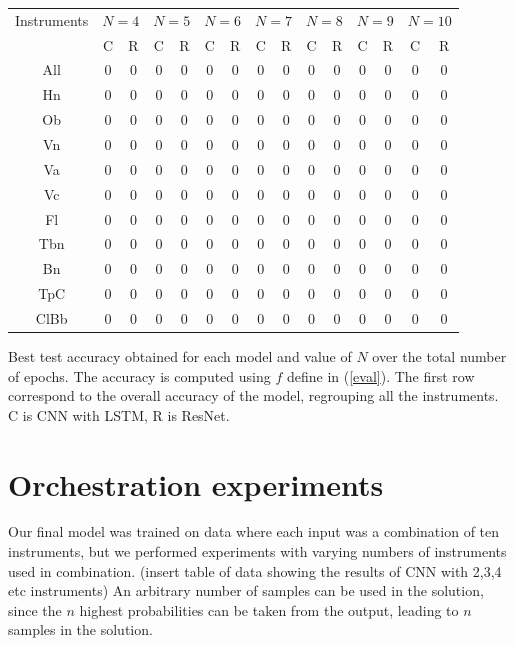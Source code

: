 \documentclass{article}
\begin{document}
\begin{table}
\begin{tabular}{|c|c|c|c|c|c|c|c|c|c|c|c|c|c|c|}
\hline
Instruments & \multicolumn{2}{c|}{$N=4$} & \multicolumn{2}{c|}{$N=5$}& \multicolumn{2}{c|}{$N=6$}& \multicolumn{2}{c|}{$N=7$}& \multicolumn{2}{c|}{$N=8$}& \multicolumn{2}{c|}{$N=9$}& \multicolumn{2}{c|}{$N=10$}\\
\cline{2-3} & C & R & C & R & C & R & C & R & C & R & C & R & C & R\\
\hline
All & 0 & 0 & 0 & 0 & 0 & 0 & 0 & 0 & 0 & 0 & 0 & 0 & 0 & 0\\
Hn & 0 & 0 & 0 & 0 & 0 & 0 & 0 & 0 & 0 & 0 & 0 & 0 & 0 & 0\\
Ob & 0 & 0 & 0 & 0 & 0 & 0 & 0 & 0 & 0 & 0 & 0 & 0 & 0 & 0\\
Vn & 0 & 0 & 0 & 0 & 0 & 0 & 0 & 0 & 0 & 0 & 0 & 0 & 0 & 0\\
Va & 0 & 0 & 0 & 0 & 0 & 0 & 0 & 0 & 0 & 0 & 0 & 0 & 0 & 0\\
Vc & 0 & 0 & 0 & 0 & 0 & 0 & 0 & 0 & 0 & 0 & 0 & 0 & 0 & 0\\
Fl & 0 & 0 & 0 & 0 & 0 & 0 & 0 & 0 & 0 & 0 & 0 & 0 & 0 & 0\\
Tbn & 0 & 0 & 0 & 0 & 0 & 0 & 0 & 0 & 0 & 0 & 0 & 0 & 0 & 0\\
Bn & 0 & 0 & 0 & 0 & 0 & 0 & 0 & 0 & 0 & 0 & 0 & 0 & 0 & 0\\
TpC & 0 & 0 & 0 & 0 & 0 & 0 & 0 & 0 & 0 & 0 & 0 & 0 & 0 & 0\\
ClBb & 0 & 0 & 0 & 0 & 0 & 0 & 0 & 0 & 0 & 0 & 0 & 0 & 0 & 0\\
\hline
\end{tabular}

\begin{caption}
Best test accuracy obtained for each model and value of $N$ over the total number of epochs. The accuracy is computed using $f$ define in (\ref{eval}). The first row correspond to the overall accuracy of the model, regrouping all the instruments. C is CNN with LSTM, R is ResNet.
\label{class_res}
\end{caption}
\end{table}

\section{Orchestration experiments}

Our final model was trained on data where each input was a combination of ten instruments, but we performed experiments with varying numbers of instruments used in combination. (insert table of data showing the results of CNN with 2,3,4 etc instruments) An arbitrary number of samples can be used in the solution, since the $n$ highest probabilities can be taken from the output, leading to $n$ samples in the solution.
\end{document}
